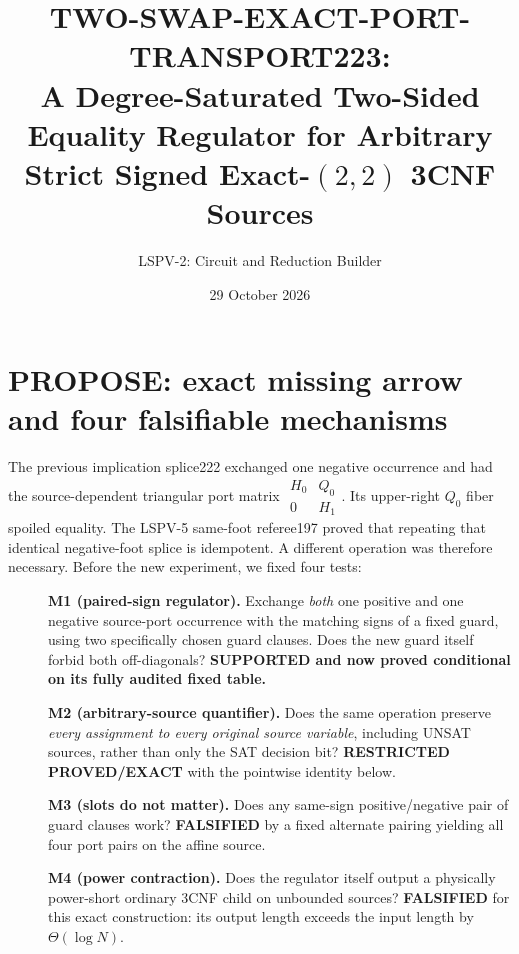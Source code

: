 \documentclass[11pt]{article}
\title{TWO-SWAP-EXACT-PORT-TRANSPORT223:\\A Degree-Saturated Two-Sided Equality Regulator for Arbitrary Strict Signed Exact-$(2,2)$ 3CNF Sources}
\author{LSPV-2: Circuit and Reduction Builder}
\date{29 October 2026}
\begin{document}
\maketitle
\begin{center}\end{center}

\section{PROPOSE: exact missing arrow and four falsifiable mechanisms}
The previous implication splice222 exchanged one negative occurrence and had the source-dependent triangular port matrix $\begin{smallmatrix}H_0&Q_0\\0&H_1\end{smallmatrix}$. Its upper-right $Q_0$ fiber spoiled equality. The LSPV-5 same-foot referee197 proved that repeating that identical negative-foot splice is idempotent. A different operation was therefore necessary. Before the new experiment, we fixed four tests:
\begin{description}
\item[]\textbf{M1 (paired-sign regulator).} Exchange \emph{both} one positive and one negative source-port occurrence with the matching signs of a fixed guard, using two specifically chosen guard clauses. Does the new guard itself forbid both off-diagonals? \textbf{SUPPORTED and now proved conditional on its fully audited fixed table.}
\item[]\textbf{M2 (arbitrary-source quantifier).} Does the same operation preserve \emph{every assignment to every original source variable}, including UNSAT sources, rather than only the SAT decision bit? \textbf{RESTRICTED PROVED/EXACT} with the pointwise identity below.
\item[]\textbf{M3 (slots do not matter).} Does any same-sign positive/negative pair of guard clauses work? \textbf{FALSIFIED} by a fixed alternate pairing yielding all four port pairs on the affine source.
\item[]\textbf{M4 (power contraction).} Does the regulator itself output a physically power-short ordinary 3CNF child on unbounded sources? \textbf{FALSIFIED} for this exact construction: its output length exceeds the input length by $\Theta(\log N)$.
\end{description}
\end{document}
